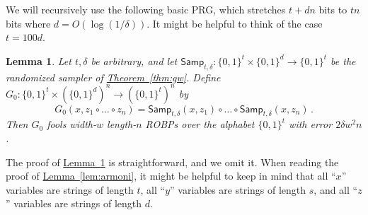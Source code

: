 \documentclass[11pt]{article}
\numberwithin{equation}{section}
\newtheorem{lemma}[theorem]{Lemma}
\theoremstyle{definition}
\theoremstyle{plain}
\newcommand{\expref}[2]{\hyperref[#2]{#1~\ref{#2}}}
\begin{document}
We will recursively use the following basic PRG, which stretches $t + dn$ bits to $tn$ bits where $d = O(\log(1/\delta))$. It might be helpful to think of the case $t = 100 d$.

\begin{lemma} \label{lem:samp-prg}
Let $t, \delta$ be arbitrary, and let $\mathsf{Samp}_{t, \delta} \colon \{0, 1\}^t \times \{0, 1\}^d \to \{0, 1\}^t$ be the randomized sampler of \expref{Theorem}{thm:gw}. Define $G_0 \colon \{0, 1\}^t \times (\{0, 1\}^d)^n \to (\{0, 1\}^t)^n$ by
$$
G_0(x, z_1 \circ \dots \circ z_n) = \mathsf{Samp}_{t, \delta}(x, z_1) \circ \dots \circ \mathsf{Samp}_{t, \delta}(x, z_n)\,.
$$
Then $G_0$ fools width-$w$ length-$n$ ROBPs over the alphabet $\{0, 1\}^t$ with error $2\delta w^2 n$.
\end{lemma}

The proof of \expref{Lemma}{lem:samp-prg} is straightforward, and we omit it. When reading the proof of \expref{Lemma}{lem:armoni}, it might be helpful to keep in mind that all ``$x$'' variables are strings of length $t$, all ``$y$'' variables are strings of length $s$, and all ``$z$'' variables are strings of length $d$.
\end{document}
